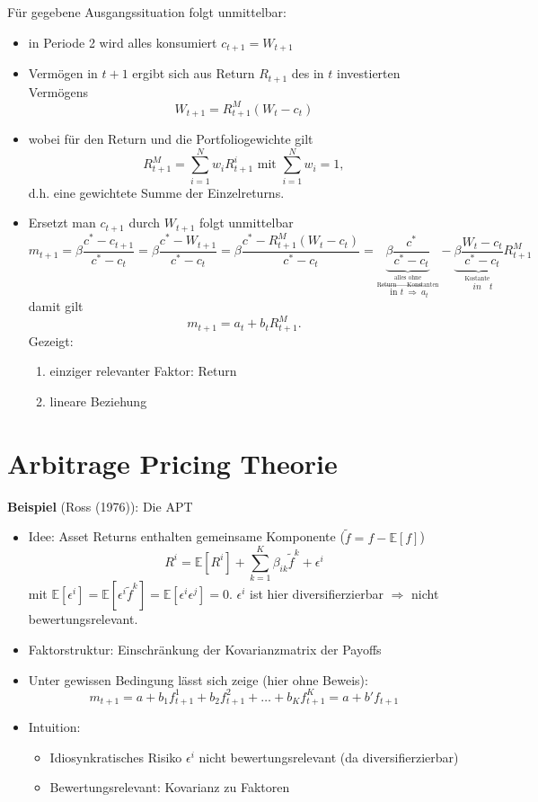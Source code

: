 \documentclass[12pt]{extreport} %
\theoremstyle{named}
\theoremstyle{nnamed}
\theoremstyle{itshape}
\theoremstyle{normal}
\begin{document}
Für gegebene Ausgangssituation folgt unmittelbar:
\begin{itemize}
	\item in Periode 2 wird alles konsumiert $c_{t+1} = W_{t+1}$
	\item Vermögen in $t+1$ ergibt sich aus Return $R_{t+1}$ des in $t$ investierten Vermögens
		$$ W_{t+1} = R^M_{t+1} \left( W_t - c_t \right) $$
	\item wobei für den Return und die Portfoliogewichte gilt
		$$ R_{t+1}^M = \sum_{i=1}^N w_i R_{t+1}^i \text{ mit } \sum_{i=1}^N w_i = 1, $$
		d.h. eine gewichtete Summe der Einzelreturns.
	\item Ersetzt man $c_{t+1}$ durch $W_{t+1}$ folgt unmittelbar
		$$ m_{t+1} = \beta \frac{c^* - c_{t+1}}{c^* - c_t} = \beta \frac{c^* - W_{t+1}}{c^* - c_t} = \beta \frac{c^* - R^M_{t+1} \left( W_t - c_{t} \right)}{c^* - c_t} =  \underbrace{\beta \frac{c^*}{c^* - c_t}}_{\overset{\text{alles ohne}}{\overset{\text{Return } \rightarrow \text{ Konstanten}}{ \text{ in } t ~ \Rightarrow ~ a_t}}} - \underbrace{\beta \frac{W_t - c_{t}}{c^* - c_t}}_{\overset{\text{Kostante}}{in } t} R_{t+1}^M $$
		damit gilt
		$$ m_{t+1} = a_t + b_t R_{t+1}^M. $$
		Gezeigt:
		\begin{enumerate}
			\item einziger relevanter Faktor: Return
			\item lineare Beziehung
		\end{enumerate}
\end{itemize}

\section{Arbitrage Pricing Theorie}

\textbf{Beispiel} (Ross (1976)): Die APT
\begin{itemize}
	\item Idee: Asset Returns enthalten gemeinsame Komponente ($\tilde{f} = f - \mathbb{E}[f]$)
		$$ R^i = \mathbb{E}[R^i] + \sum_{k=1}^K \beta_{ik} \tilde{f}^k + \epsilon^i $$
		mit $\mathbb{E}[\epsilon^i] = \mathbb{E}[\epsilon^i \tilde{f}^k] = \mathbb{E}[\epsilon^i \epsilon^j] = 0$. $\epsilon^i$ ist hier diversifierzierbar $\Rightarrow$ nicht bewertungsrelevant.
	\item Faktorstruktur: Einschränkung der Kovarianzmatrix der Payoffs
	\item Unter gewissen Bedingung lässt sich zeige (hier ohne Beweis):
		$$ m_{t+1} = a + b_1 f_{t+1}^1 + b_2 f_{t+1}^2 + \dotsc+ b_K f_{t+1}^K = a + b' f_{t+1} $$
	\item Intuition:
		\begin{itemize}
			\item Idiosynkratisches Risiko $\epsilon^i$ nicht bewertungsrelevant (da diversifierzierbar)
			\item Bewertungsrelevant: Kovarianz zu Faktoren
		\end{itemize}
\end{itemize}
\end{document}
